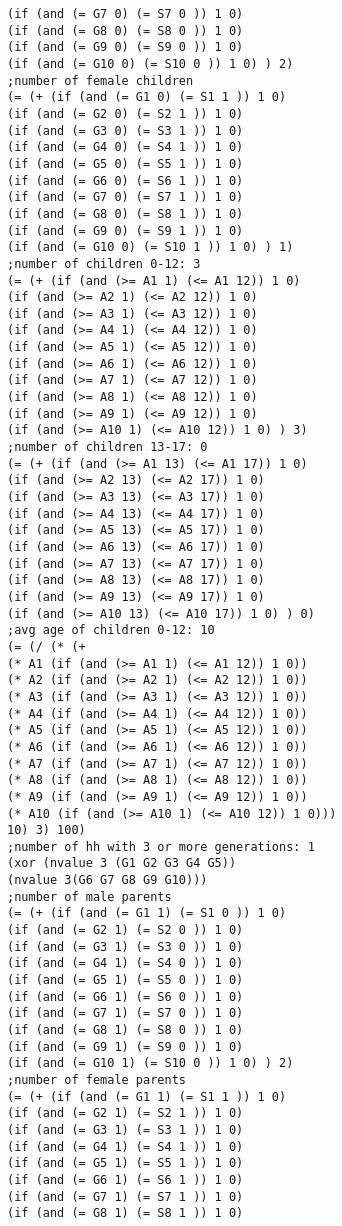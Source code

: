\documentclass[runningheads]{llncs}
\begin{document}
\begin{verbatim}
(if (and (= G7 0) (= S7 0 )) 1 0)
(if (and (= G8 0) (= S8 0 )) 1 0)
(if (and (= G9 0) (= S9 0 )) 1 0)
(if (and (= G10 0) (= S10 0 )) 1 0) ) 2)
;number of female children
(= (+ (if (and (= G1 0) (= S1 1 )) 1 0)
(if (and (= G2 0) (= S2 1 )) 1 0)
(if (and (= G3 0) (= S3 1 )) 1 0)
(if (and (= G4 0) (= S4 1 )) 1 0)
(if (and (= G5 0) (= S5 1 )) 1 0)
(if (and (= G6 0) (= S6 1 )) 1 0)
(if (and (= G7 0) (= S7 1 )) 1 0)
(if (and (= G8 0) (= S8 1 )) 1 0)
(if (and (= G9 0) (= S9 1 )) 1 0)
(if (and (= G10 0) (= S10 1 )) 1 0) ) 1)
;number of children 0-12: 3
(= (+ (if (and (>= A1 1) (<= A1 12)) 1 0)
(if (and (>= A2 1) (<= A2 12)) 1 0)
(if (and (>= A3 1) (<= A3 12)) 1 0)
(if (and (>= A4 1) (<= A4 12)) 1 0)
(if (and (>= A5 1) (<= A5 12)) 1 0)
(if (and (>= A6 1) (<= A6 12)) 1 0)
(if (and (>= A7 1) (<= A7 12)) 1 0)
(if (and (>= A8 1) (<= A8 12)) 1 0)
(if (and (>= A9 1) (<= A9 12)) 1 0)
(if (and (>= A10 1) (<= A10 12)) 1 0) ) 3)
;number of children 13-17: 0
(= (+ (if (and (>= A1 13) (<= A1 17)) 1 0)
(if (and (>= A2 13) (<= A2 17)) 1 0)
(if (and (>= A3 13) (<= A3 17)) 1 0)
(if (and (>= A4 13) (<= A4 17)) 1 0)
(if (and (>= A5 13) (<= A5 17)) 1 0)
(if (and (>= A6 13) (<= A6 17)) 1 0)
(if (and (>= A7 13) (<= A7 17)) 1 0)
(if (and (>= A8 13) (<= A8 17)) 1 0)
(if (and (>= A9 13) (<= A9 17)) 1 0)
(if (and (>= A10 13) (<= A10 17)) 1 0) ) 0)
;avg age of children 0-12: 10
(= (/ (* (+
(* A1 (if (and (>= A1 1) (<= A1 12)) 1 0))
(* A2 (if (and (>= A2 1) (<= A2 12)) 1 0))
(* A3 (if (and (>= A3 1) (<= A3 12)) 1 0))
(* A4 (if (and (>= A4 1) (<= A4 12)) 1 0))
(* A5 (if (and (>= A5 1) (<= A5 12)) 1 0))
(* A6 (if (and (>= A6 1) (<= A6 12)) 1 0))
(* A7 (if (and (>= A7 1) (<= A7 12)) 1 0))
(* A8 (if (and (>= A8 1) (<= A8 12)) 1 0))
(* A9 (if (and (>= A9 1) (<= A9 12)) 1 0))
(* A10 (if (and (>= A10 1) (<= A10 12)) 1 0)))
10) 3) 100)
;number of hh with 3 or more generations: 1
(xor (nvalue 3 (G1 G2 G3 G4 G5))
(nvalue 3(G6 G7 G8 G9 G10)))
;number of male parents
(= (+ (if (and (= G1 1) (= S1 0 )) 1 0)
(if (and (= G2 1) (= S2 0 )) 1 0)
(if (and (= G3 1) (= S3 0 )) 1 0)
(if (and (= G4 1) (= S4 0 )) 1 0)
(if (and (= G5 1) (= S5 0 )) 1 0)
(if (and (= G6 1) (= S6 0 )) 1 0)
(if (and (= G7 1) (= S7 0 )) 1 0)
(if (and (= G8 1) (= S8 0 )) 1 0)
(if (and (= G9 1) (= S9 0 )) 1 0)
(if (and (= G10 1) (= S10 0 )) 1 0) ) 2)
;number of female parents
(= (+ (if (and (= G1 1) (= S1 1 )) 1 0)
(if (and (= G2 1) (= S2 1 )) 1 0)
(if (and (= G3 1) (= S3 1 )) 1 0)
(if (and (= G4 1) (= S4 1 )) 1 0)
(if (and (= G5 1) (= S5 1 )) 1 0)
(if (and (= G6 1) (= S6 1 )) 1 0)
(if (and (= G7 1) (= S7 1 )) 1 0)
(if (and (= G8 1) (= S8 1 )) 1 0)

\end{verbatim}
\end{document}

